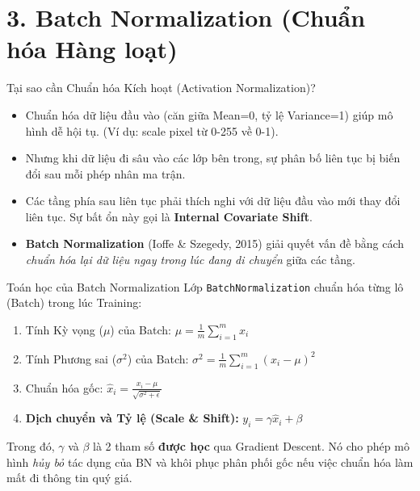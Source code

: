 \documentclass[aspectratio=169]{beamer}
\begin{document}
\section{3. Batch Normalization (Chuẩn hóa Hàng loạt)}

\begin{frame}{Tại sao cần Chuẩn hóa Kích hoạt (Activation Normalization)?}
    \begin{itemize}
        \item Chuẩn hóa dữ liệu đầu vào (căn giữa Mean=0, tỷ lệ Variance=1) giúp mô hình dễ hội tụ. (Ví dụ: scale pixel từ 0-255 về 0-1).
        \item Nhưng khi dữ liệu đi sâu vào các lớp bên trong, sự phân bố liên tục bị biến đổi sau mỗi phép nhân ma trận.
        \item Các tầng phía sau liên tục phải thích nghi với dữ liệu đầu vào mới thay đổi liên tục. Sự bất ổn này gọi là \textbf{Internal Covariate Shift}.
        \item \textbf{Batch Normalization} (Ioffe \& Szegedy, 2015) giải quyết vấn đề bằng cách \textit{chuẩn hóa lại dữ liệu ngay trong lúc đang di chuyển} giữa các tầng.
    \end{itemize}
\end{frame}

\begin{frame}{Toán học của Batch Normalization}
    Lớp \texttt{BatchNormalization} chuẩn hóa từng lô (Batch) trong lúc Training:
    \begin{enumerate}
        \item Tính Kỳ vọng ($\mu$) của Batch: $\mu = \frac{1}{m} \sum_{i=1}^m x_i$
        \item Tính Phương sai ($\sigma^2$) của Batch: $\sigma^2 = \frac{1}{m} \sum_{i=1}^m (x_i - \mu)^2$
        \item Chuẩn hóa gốc: $\hat{x}_i = \frac{x_i - \mu}{\sqrt{\sigma^2 + \epsilon}}$
        \item \textbf{Dịch chuyển và Tỷ lệ (Scale \& Shift):} $y_i = \gamma \hat{x}_i + \beta$
    \end{enumerate}
    Trong đó, $\gamma$ và $\beta$ là 2 tham số \textbf{được học} qua Gradient Descent. Nó cho phép mô hình \textit{hủy bỏ} tác dụng của BN và khôi phục phân phối gốc nếu việc chuẩn hóa làm mất đi thông tin quý giá.
\end{frame}
\end{document}
